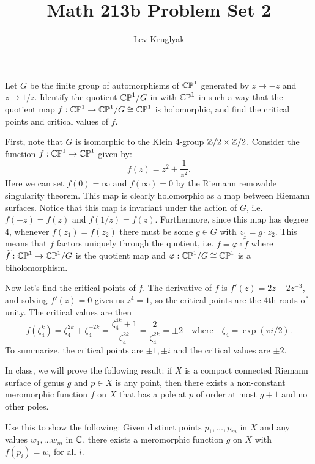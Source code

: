 \documentclass[expanded]{lkx_pset}
\title{Math 213b Problem Set 2}
\author{Lev Kruglyak}
\begin{document}
\maketitle

\begin{problem}{1}
Let $G$ be the finite group of automorphisms of $\mathbb{CP}^{1}$ generated by
$z\mapsto -z$ and $z\mapsto 1/z$. Identify the quotient $\mathbb{CP}^{1}/G$ in
with $\mathbb{CP}^{1}$ in such a way that the quotient map $f: \mathbb{CP}^{1}\to
	\mathbb{CP}^{1}/G \cong \mathbb{CP}^{1}$ is holomorphic, and find the critical points
and critical values of $f$.
\end{problem}

\begin{solution}
	First, note that $G$ is isomorphic to the Klein $4$-group $\mathbb{Z}/2\times \mathbb{Z}/2$.
	Consider the function $f : \mathbb{CP}^1 \to \mathbb{CP}^1$ given by:
	\[
		f(z) = z^2 + \frac{1}{z^2}.
	\]
	Here we can set $f(0)=\infty$ and $f(\infty)=0$ by the Riemann removable singularity theorem. This map is clearly holomorphic as a map between Riemann surfaces. Notice that this map is invariant under the action of $G$, i.e. $f(-z)=f(z)$ and $f(1/z)=f(z)$. Furthermore, since this map has degree $4$, whenever $f(z_1)=f(z_2)$ there must be some $g\in G$ with $z_1 = g\cdot z_2$. This means that $f$ factors uniquely through the quotient, i.e. $f = \varphi \circ \widetilde{f}$ where $\widetilde{f} : \mathbb{CP}^1 \to \mathbb{CP}^1/G$ is the quotient map and $\varphi : \mathbb{CP}^1/G \cong \mathbb{CP}^1$ is a biholomorphism.

	Now let's find the critical points of $f$. The derivative of $f$ is $f'(z) = 2z-2z^{-3}$, and solving $f'(z)=0$ gives us $z^4=1$, so the critical points are the $4$th roots of unity. The critical values are then
	\[
		f(\zeta_4^k) = \zeta_4^{2k} + \zeta_4^{-2k} = \frac{\zeta_4^{4k}+1}{\zeta_4^{2k}} = \frac{2}{\zeta_4^{2k}} = \pm 2\quad\textrm{where}\quad \zeta_4=\exp(\pi i/2).
	\]
	To summarize, the critical points are $\pm 1, \pm i$ and the critical values are $\pm 2$.
\end{solution}

\begin{problem}{2}
In class, we will prove the
following result: if $X$ is a compact connected Riemann surface of
genus $g$ and $p\in X$ is any point, then there exists a non-constant meromorphic
function $f$ on $X$ that has a pole at $p$ of order at most $g+1$ and
no other poles.
\end{problem}

\begin{parts}
	\begin{part}
		Use this to show the following: Given
		distinct points $p_{1},\dots, p_{m}$ in $X$ and any values
		$w_{1},\dots w_{m}$ in $\mathbb{C}$, there exists a meromorphic function $g$
		on $X$ with $f(p_{i})=w_{i}$ for all $i$.
	\end{part}
\end{parts}
\end{document}
